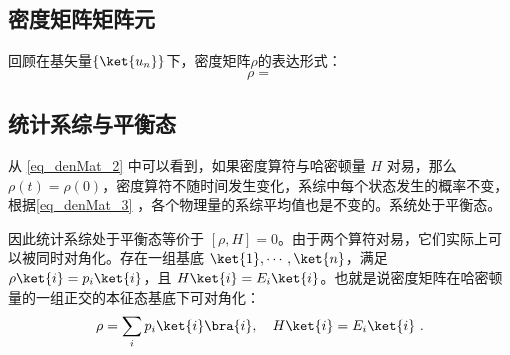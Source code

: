 \subsection{密度矩阵矩阵元}

回顾在基矢量$\left\{ \ket{u_n}\right\}$下，密度矩阵$\rho$的表达形式：
$$\rho = $$



\subsection{统计系综与平衡态}
从 \autoref{eq_denMat_2} 中可以看到，如果密度算符与哈密顿量 $H$ 对易，那么 $\rho(t)=\rho(0)$，密度算符不随时间发生变化，系综中每个状态发生的概率不变，根据\autoref{eq_denMat_3} ，各个物理量的系综平均值也是不变的。系统处于平衡态。

因此统计系综处于平衡态等价于 $[\rho,H]=0$。由于两个算符对易，它们实际上可以被同时对角化。存在一组基底 $\ket{1},\cdots,\ket{n}$，满足 $\rho \ket{i} = p_i \ket{i}$，且 $H\ket{i}=E_i \ket{i}$。也就是说密度矩阵在哈密顿量的一组正交的本征态基底下可对角化：
\begin{equation}
\rho = \sum_i p_i \ket{i}\bra{i},\quad H\ket{i}=E_i \ket{i}~.
\end{equation}


